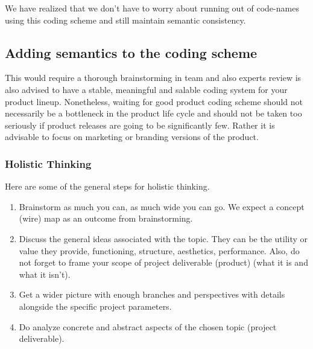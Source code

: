 We have realized that we don't have to worry about running out of code-names using this coding scheme and still maintain semantic consistency.

\subsection{Adding semantics to the coding scheme}

This would require a thorough brainstorming in team and also experts review is also advised to have a stable, meaningful and salable coding system for your product lineup. Nonetheless, waiting for good product coding scheme should not necessarily be a bottleneck in the product life cycle and should not be taken too seriously if product releases are going to be significantly few. Rather it is advisable to focus on marketing or branding versions of the product.

\subsubsection{Holistic Thinking}

Here are some of the general steps for holistic thinking.

\begin{enumerate}
    \item Brainstorm as much you can, as much wide you can go. We expect a concept (wire) map as an outcome from brainstorming.

    \item Discuss the general ideas associated with the topic. They can be the utility or value they provide, functioning, structure, aesthetics, performance. Also, do not forget to frame your scope of project deliverable (product) (what it is and what it isn't).

    \item Get a wider picture with enough branches and perspectives with details alongside the specific project parameters.

    \item Do analyze concrete and abstract aspects of the chosen topic (project deliverable).
\end{enumerate}

